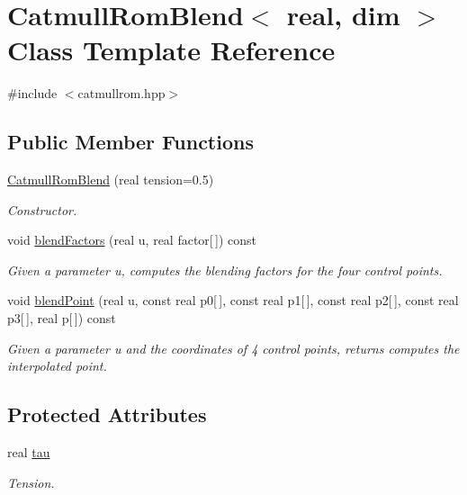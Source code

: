 \hypertarget{classCatmullRomBlend}{
\section{CatmullRomBlend$<$ real, dim $>$ Class Template Reference}
\label{classCatmullRomBlend}
}


{\ttfamily \#include $<$catmullrom.hpp$>$}

\subsection*{Public Member Functions}
\begin{DoxyCompactItemize}
\item 
\hyperlink{classCatmullRomBlend_aa6064a7b7c7ce3ad80485c31f1d24142}{CatmullRomBlend} (real tension=0.5)
\begin{DoxyCompactList}\small\item\em Constructor. \end{DoxyCompactList}\item 
void \hyperlink{classCatmullRomBlend_a56e328baf4beb49e924d847ba727edce}{blendFactors} (real u, real factor\mbox{[}$\,$\mbox{]}) const 
\begin{DoxyCompactList}\small\item\em Given a parameter u, computes the blending factors for the four control points. \end{DoxyCompactList}\item 
void \hyperlink{classCatmullRomBlend_a7ec31af121c83ccf2f8a6a42d79b51fa}{blendPoint} (real u, const real p0\mbox{[}$\,$\mbox{]}, const real p1\mbox{[}$\,$\mbox{]}, const real p2\mbox{[}$\,$\mbox{]}, const real p3\mbox{[}$\,$\mbox{]}, real p\mbox{[}$\,$\mbox{]}) const 
\begin{DoxyCompactList}\small\item\em Given a parameter u and the coordinates of 4 control points, returns computes the interpolated point. \end{DoxyCompactList}\end{DoxyCompactItemize}
\subsection*{Protected Attributes}
\begin{DoxyCompactItemize}
\item 
\hypertarget{classCatmullRomBlend_a8a694bbc355517f628c36c3a52c9e48a}{
real \hyperlink{classCatmullRomBlend_a8a694bbc355517f628c36c3a52c9e48a}{tau}}
\label{classCatmullRomBlend_a8a694bbc355517f628c36c3a52c9e48a}

\begin{DoxyCompactList}\small\item\em Tension. \end{DoxyCompactList}\end{DoxyCompactItemize}


